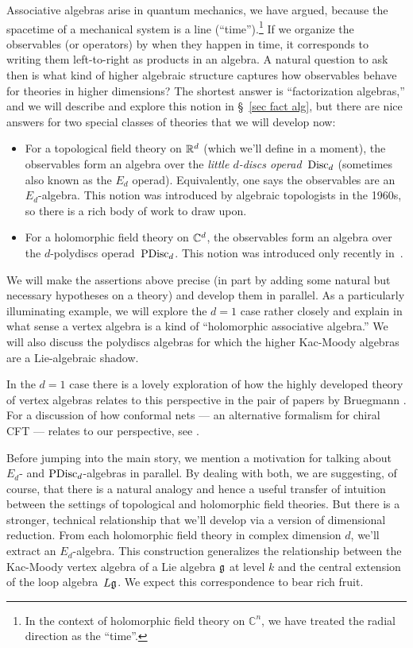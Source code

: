 \documentclass[11pt]{amsart}
\def\C{{\mathbb{C}}}
\begin{document}
Associative algebras arise in quantum mechanics, we have argued, because the spacetime of a mechanical system is a line (``time'').\footnote{In the context of holomorphic field theory on $\C^n$, we have treated the radial direction as the ``time''.}
If we organize the observables (or operators) by when they happen in time,
it corresponds to writing them left-to-right as products in an algebra.
A natural question to ask then is what kind of higher algebraic structure captures how observables behave for theories in higher dimensions?
The shortest answer is ``factorization algebras,'' and we will describe and explore this notion in \S~\ref{sec fact alg},
but there are nice answers for two special classes of theories that we will develop now:
\begin{itemize}
\item For a topological field theory on $\mathbb R^d$ (which we'll define in a moment),
the observables form an algebra over the {\em little $d$-discs operad}~${\rm Disc}_d$ (sometimes also known as the $E_d$ operad). 
Equivalently, one says the observables are an $E_d$-algebra. 
This notion was introduced by algebraic topologists in the 1960s, 
so there is a rich body of work to draw upon.
\item For a holomorphic field theory on $\mathbb C^d$,
the observables form an algebra over the $d$-polydiscs operad~${\rm PDisc}_d$.
This notion was introduced only recently in~\cite{CG1}.
\end{itemize}
We will make the assertions above precise (in part by adding some natural but necessary hypotheses on a theory)
and develop them in parallel.
As a particularly illuminating example, we will explore the $d=1$ case rather closely and explain in what sense a vertex algebra is a kind of ``holomorphic associative algebra.''
We will also discuss the polydiscs algebras for which the higher Kac-Moody algebras are a Lie-algebraic shadow.

\begin{rmk}
In the $d=1$ case there is a lovely exploration of how the highly developed theory of vertex algebras relates to this perspective in the pair of papers by Bruegmann \cite{}.
For a discussion of how conformal nets --- an alternative formalism for chiral CFT --- relates to our perspective, see \cite{Henriques}.
\end{rmk}

Before jumping into the main story, we mention a motivation for talking about $E_d$- and ${\rm PDisc}_d$-algebras in parallel.
By dealing with both, we are suggesting, of course, that there is a natural analogy and hence a useful transfer of intuition between the settings of topological and holomorphic field theories.
But there is a stronger, technical relationship that we'll develop via a version of dimensional reduction.
From each holomorphic field theory in complex dimension $d$, 
we'll extract an $E_d$-algebra.
This construction generalizes the relationship between the Kac-Moody vertex algebra of a Lie algebra $\mathfrak g$ at level $k$ and the central extension of the loop algebra~$L\mathfrak g$.
We expect this correspondence to bear rich fruit.
\end{document}
